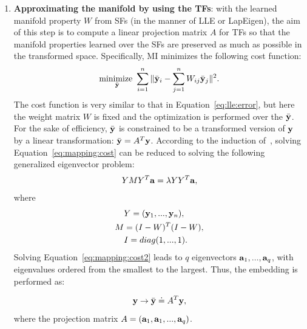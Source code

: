 \begin{enumerate} [leftmargin=4.5mm]
\begin{enumerate} [leftmargin=5mm]
   \end{enumerate}

 \item \textbf{Approximating the manifold by using the TFs}: with the
   learned manifold property $W$ from SFs (in the manner of LLE or
   LapEigen), the aim of this step is to compute a linear projection
   matrix $A$ for TFs so that the manifold properties learned over the
   SFs are preserved as much as possible in the transformed space. 
   Specifically, MI minimizes the following cost
   function:
   \begin{equation}
     \label{eq:mapping:cost}
         \begin{aligned}
         \underset{\bar{{\mathbf y}}} {\text {minimize }}  \sum_{i=1}^n  \| \bar{{\mathbf y}}_i - \sum_{j=1}^n W_{ij} \bar{{\mathbf y}}_j \|^2. \\
         \end{aligned}
   \end{equation}
   The cost function is very similar to that in Equation~\ref{eq:lle:error},
   but here the weight matrix $W$ is fixed and the optimization is
   performed over the $\bar{{\mathbf y}}$. For the sake of efficiency,
   $\bar{{\mathbf y}}$ is constrained to be a transformed version of
   ${{\mathbf y}}$ by a linear transformation: $\bar{{\mathbf y}} = A^T{{\mathbf y}}$.
According to the induction of~\citep{NPEmbedding:iccv05}, solving Equation~\ref{eq:mapping:cost} can be reduced to solving
   the following generalized eigenvector problem:
   \begin{equation}
     \label{eq:mapping:cost2}
         \begin{aligned}
           YMY^T {\mathbf a} = \lambda YY^T {\mathbf a},
         \end{aligned}
   \end{equation}
   where  
 \begin{align*}
     & Y = ({{\mathbf y}}_1, ..., {{\mathbf y}}_n), \\
     M &= (I-W)^T (I-W),   \\
     &I = diag(1, ..., 1).  
\end{align*}
Solving Equation~\ref{eq:mapping:cost2} leads to $q$ eigenvectors
${\mathbf a}_1, ..., {\mathbf a}_q$, with eigenvalues ordered from the
smallest to the largest.  Thus, the embedding is performed as:

\begin{equation}
  \label{eq:embedding}
  {{\mathbf y}} \to \bar{{\mathbf y}} \doteq A^T {{\mathbf y}}, 
\end{equation}
where the projection matrix $A = ({\mathbf a}_1, {\mathbf a}_1, ...,
{\mathbf a}_{q})$.
\end{enumerate}

